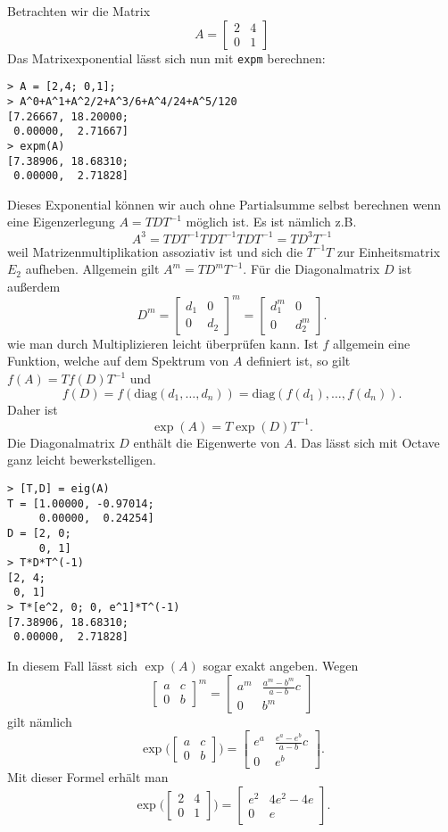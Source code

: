 \documentclass[a4paper,11pt,fleqn,twocolumn,twoside,dvipdfmx]{scrartcl}
\begin{document}
Betrachten wir die Matrix
\[A=\begin{bmatrix}
2 & 4\\
0 & 1
\end{bmatrix}\]
Das Matrixexponential lässt sich nun mit \texttt{expm} berechnen:
\begin{verbatim}
> A = [2,4; 0,1];
> A^0+A^1+A^2/2+A^3/6+A^4/24+A^5/120
[7.26667, 18.20000;
 0.00000,  2.71667]
> expm(A)
[7.38906, 18.68310;
 0.00000,  2.71828]
\end{verbatim}
Dieses Exponential können wir auch ohne Partialsumme selbst berechnen
wenn eine Eigenzerlegung $A=TDT^{-1}$ möglich ist. Es ist nämlich z.B.
\[A^3 = TDT^{-1}TDT^{-1}TDT^{-1} = TD^3T^{-1}\]
weil Matrizenmultiplikation assoziativ ist und sich die $T^{-1}T$
zur Einheitsmatrix $E_2$ aufheben. Allgemein gilt $A^m=TD^mT^{-1}$.
Für die Diagonalmatrix $D$ ist außerdem
\[D^m = \begin{bmatrix}
d_1 & 0\\
0 & d_2
\end{bmatrix}^m
= \begin{bmatrix}
d_1^m & 0\\
0 & d_2^m
\end{bmatrix}.\]
wie man durch Multiplizieren leicht überprüfen kann.
Ist $f$ allgemein eine Funktion, welche auf dem Spektrum von
$A$ definiert ist, so gilt $f(A)=Tf(D)T^{-1}$ und
\[f(D) = f(\mathrm{diag}(d_1,\ldots,d_n))
= \mathrm{diag}(f(d_1),\ldots,f(d_n)).\]
Daher ist
\[\exp(A) = T\exp(D)T^{-1}.\]
Die Diagonalmatrix $D$ enthält die Eigenwerte von $A$.
Das lässt sich mit Octave ganz leicht bewerkstelligen.
\begin{verbatim}
> [T,D] = eig(A)
T = [1.00000, -0.97014;
     0.00000,  0.24254]
D = [2, 0;
     0, 1]
> T*D*T^(-1)
[2, 4;
 0, 1]
> T*[e^2, 0; 0, e^1]*T^(-1)
[7.38906, 18.68310;
 0.00000,  2.71828]
\end{verbatim}
In diesem Fall lässt sich $\exp(A)$ sogar exakt angeben.
Wegen
\[\begin{bmatrix}
a & c\\
0 & b
\end{bmatrix}^m
=\begin{bmatrix}
a^m & \frac{a^m-b^m}{a-b}c\\
0 & b^m
\end{bmatrix}
\]
gilt nämlich
\[\exp\bigg(\begin{bmatrix}
a & c\\
0 & b
\end{bmatrix}\bigg)
=\begin{bmatrix}
e^a & \frac{e^a-e^b}{a-b}c\\
0 & e^b
\end{bmatrix}.
\]
Mit dieser Formel erhält man
\[\exp\bigg(\begin{bmatrix}
2 & 4\\
0 & 1
\end{bmatrix}\bigg)
=\begin{bmatrix}
e^2 & 4e^2-4e\\
0 & e
\end{bmatrix}.
\]
\end{document}
